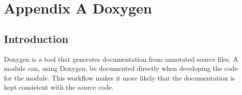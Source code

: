 \section*{Appendix A Doxygen}

\subsection*{Introduction}

Doxygen is a tool that generates documentation from annotated source files. A module can, using Doxygen, be documented directly when developing the code for the module. This workflow makes it more likely that the documentation is kept consistent with the source code.
